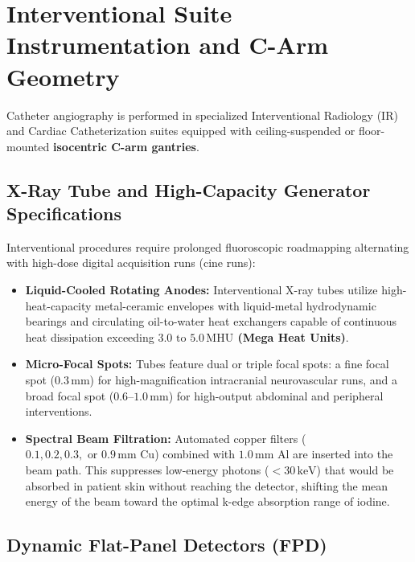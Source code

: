 \documentclass[11pt,a4paper]{article}
\begin{document}
\newpage
\section{Interventional Suite Instrumentation and C-Arm Geometry}

Catheter angiography is performed in specialized Interventional Radiology (IR) and Cardiac Catheterization suites equipped with ceiling-suspended or floor-mounted \textbf{isocentric C-arm gantries}.

\subsection{X-Ray Tube and High-Capacity Generator Specifications}

Interventional procedures require prolonged fluoroscopic roadmapping alternating with high-dose digital acquisition runs (cine runs):
\begin{itemize}[leftmargin=*]
    \item \textbf{Liquid-Cooled Rotating Anodes:} Interventional X-ray tubes utilize high-heat-capacity metal-ceramic envelopes with liquid-metal hydrodynamic bearings and circulating oil-to-water heat exchangers capable of continuous heat dissipation exceeding \textbf{$3.0\text{ to }5.0\,\text{MHU}$ (Mega Heat Units)}.
    \item \textbf{Micro-Focal Spots:} Tubes feature dual or triple focal spots: a fine focal spot ($0.3\,\text{mm}$) for high-magnification intracranial neurovascular runs, and a broad focal spot ($0.6\text{--}1.0\,\text{mm}$) for high-output abdominal and peripheral interventions.
    \item \textbf{Spectral Beam Filtration:} Automated copper filters ($0.1, 0.2, 0.3,\text{ or }0.9\,\text{mm Cu}$) combined with $1.0\,\text{mm Al}$ are inserted into the beam path. This suppresses low-energy photons ($< 30\,\text{keV}$) that would be absorbed in patient skin without reaching the detector, shifting the mean energy of the beam toward the optimal k-edge absorption range of iodine.
\end{itemize}

\subsection{Dynamic Flat-Panel Detectors (FPD)}
\end{document}
